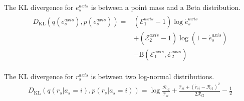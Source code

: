 The KL divergence for $e_s^{axis}$ is between a point mass and a Beta distribution.
\begin{align}
\begin{split}
D_{\mathrm{KL}}(q(e_s^{axis}), p(e_s^{axis}))
= &(\mathcal E_1^{axis} - 1)\log \acute e_s^{axis}\\
&+ (\mathcal E_2^{axis} - 1) \log (1 - \acute e_s^{axis})\\
&- \mathrm{B}(\mathcal E_1^{axis}, \mathcal E_2^{axis})
\end{split}
\end{align}

The KL divergence for $r_s^{axis}$ is between two log-normal distributions.
\begin{align}
D_{\mathrm{KL}}(q(r_s | a_s = i), p(r_s | a_s = i)) =
\log\frac{\mathcal R_{i2}}{\hat r_{si}}
  +\frac{\hat r_{si} + \left(\acute r_{si}-\mathcal R_{i1}\right)^{2}}{2\mathcal R_{i2}}
  -\frac{1}{2}
\end{align}
